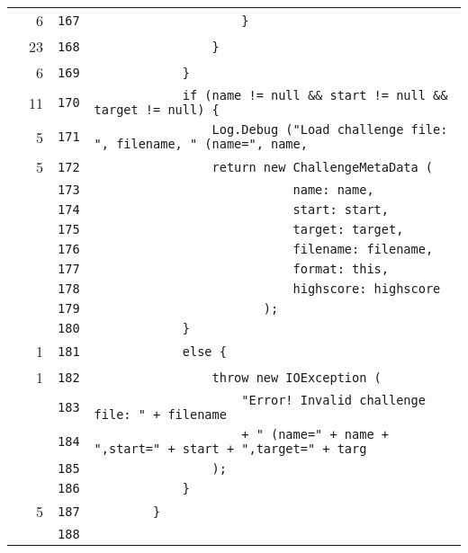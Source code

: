\documentclass[a4paper,10pt]{article}
\begin{document}
\begin{longtable}[l]{lrrl}
\cellcolor{green} & 6 & \verb~167~ & \verb~                    }~\\
\cellcolor{green} & 23 & \verb~168~ & \verb~                }~\\
\cellcolor{green} & 6 & \verb~169~ & \verb~            }~\\
\cellcolor{green} & 11 & \verb~170~ & \verb~            if (name != null && start != null && target != null) {~\\
\cellcolor{green} & 5 & \verb~171~ & \verb~                Log.Debug ("Load challenge file: ", filename, " (name=", name,~\\
\cellcolor{green} & 5 & \verb~172~ & \verb~                return new ChallengeMetaData (~\\
\cellcolor{gray} &  & \verb~173~ & \verb~                           name: name,~\\
\cellcolor{gray} &  & \verb~174~ & \verb~                           start: start,~\\
\cellcolor{gray} &  & \verb~175~ & \verb~                           target: target,~\\
\cellcolor{gray} &  & \verb~176~ & \verb~                           filename: filename,~\\
\cellcolor{gray} &  & \verb~177~ & \verb~                           format: this,~\\
\cellcolor{gray} &  & \verb~178~ & \verb~                           highscore: highscore~\\
\cellcolor{gray} &  & \verb~179~ & \verb~                       );~\\
\cellcolor{gray} &  & \verb~180~ & \verb~            }~\\
\cellcolor{green} & 1 & \verb~181~ & \verb~            else {~\\
\cellcolor{green} & 1 & \verb~182~ & \verb~                throw new IOException (~\\
\cellcolor{gray} &  & \verb~183~ & \verb~                    "Error! Invalid challenge file: " + filename~\\
\cellcolor{gray} &  & \verb~184~ & \verb~                    + " (name=" + name + ",start=" + start + ",target=" + targ~\\
\cellcolor{gray} &  & \verb~185~ & \verb~                );~\\
\cellcolor{gray} &  & \verb~186~ & \verb~            }~\\
\cellcolor{green} & 5 & \verb~187~ & \verb~        }~\\
\cellcolor{gray} &  & \verb~188~ & \verb~~\\

\end{longtable}
\end{document}
